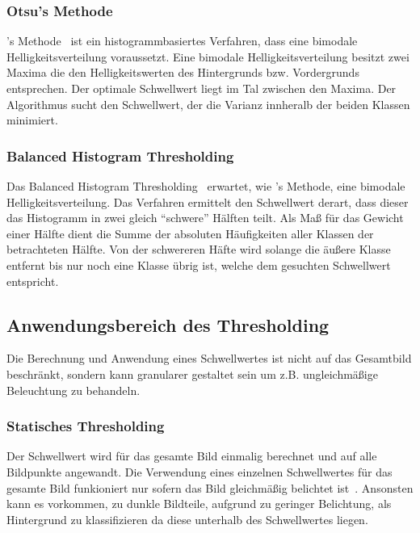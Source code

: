 
\subsubsection*{Otsu's Methode}
's Methode~\cite{otsu1979} ist ein histogrammbasiertes Verfahren, dass eine bimodale Helligkeitsverteilung voraussetzt.
Eine bimodale Helligkeitsverteilung besitzt zwei Maxima die den Helligkeitswerten des Hintergrunds bzw. Vordergrunds entsprechen.
Der optimale Schwellwert liegt im Tal zwischen den Maxima.
Der Algorithmus sucht den Schwellwert, der die Varianz innheralb der beiden Klassen minimiert.

\subsubsection*{Balanced Histogram Thresholding}
Das Balanced Histogram Thresholding~\cite{DBLP:conf/biostec/AnjosS08} erwartet, wie 's Methode, eine bimodale Helligkeitsverteilung.
Das Verfahren ermittelt den Schwellwert derart, dass dieser das Histogramm in zwei gleich "`schwere"' Hälften teilt.
Als Maß für das Gewicht einer Hälfte dient die Summe der absoluten Häufigkeiten aller Klassen der betrachteten Hälfte.
Von der schwereren Häfte wird solange die äußere Klasse entfernt bis nur noch eine Klasse übrig ist, welche dem gesuchten Schwellwert entspricht.

\subsection*{Anwendungsbereich des Thresholding}
Die Berechnung und Anwendung eines Schwellwertes ist nicht auf das Gesamtbild beschränkt, sondern kann granularer gestaltet sein um z.B. ungleichmäßige Beleuchtung zu behandeln.

\subsubsection*{Statisches Thresholding}
Der Schwellwert wird für das gesamte Bild einmalig berechnet und auf alle Bildpunkte angewandt.
Die Verwendung eines einzelnen Schwellwertes für das gesamte Bild funkioniert nur sofern das Bild gleichmäßig belichtet ist~\cite[Kapitel~4.3]{davies2012}.
Ansonsten kann es vorkommen, zu dunkle Bildteile, aufgrund zu geringer Belichtung, als Hintergrund zu klassifizieren da diese unterhalb des Schwellwertes liegen.

